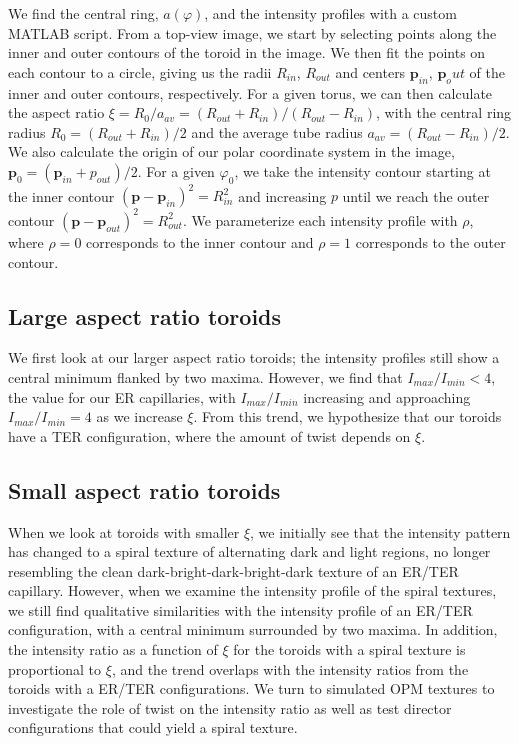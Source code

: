 We find the central ring, $a(\varphi)$, and the intensity profiles with a custom MATLAB script.
From a top-view image, we start by selecting points along the inner and outer contours of the toroid in the image.
We then fit the points on each contour to a circle, giving us the radii $R_{in}$, $R_{out}$ and centers $\mathbf{p}_{in}$, $\mathbf{p}_out$ of the inner and outer contours, respectively.
For a given torus, we can then calculate the aspect ratio $\xi = R_0/a_{av} = (R_{out}+R_{in})/(R_{out}-R_{in})$, with the central ring radius $R_0=(R_{out}+R_{in})/2$ and the average tube radius $a_{av} = (R_{out}-R_{in})/2$.
We also calculate the origin of our polar coordinate system in the image, $\mathbf{p}_0 = (\mathbf{p}_{in}+p_{out})/2$.
For a given $\varphi_0$, we take the intensity contour starting at the inner contour $(\mathbf{p}-\mathbf{p}_{in})^2 = R^2_{in}$ and increasing $p$ until we reach the outer contour $(\mathbf{p}-\mathbf{p}_{out})^2 = R^2_{out}$.
We parameterize each intensity profile with $\rho$, where $\rho = 0$ corresponds to the inner contour and $\rho = 1$ corresponds to the outer contour.


\subsection{Large aspect ratio toroids}
We first look at our larger aspect ratio toroids; the intensity profiles still show a central minimum flanked by two maxima.
However, we find that $I_{max}/I_{min} < 4$, the value for our ER capillaries, with $I_{max}/I_{min}$ increasing and approaching $I_{max}/I_{min} = 4$ as we increase $\xi$.
From this trend, we hypothesize that our toroids have a TER configuration, where the amount of twist depends on $\xi$.


\subsection{Small aspect ratio toroids}
When we look at toroids with smaller $\xi$, we initially see that the intensity pattern has changed to a spiral texture of alternating dark and light regions, no longer resembling the clean dark-bright-dark-bright-dark texture of an ER/TER capillary.
However, when we examine the intensity profile of the spiral textures, we still find qualitative similarities with the intensity profile of an ER/TER configuration, with a central minimum surrounded by two maxima.
In addition, the intensity ratio as a function of $\xi$ for the toroids with a spiral texture is proportional to $\xi$, and the trend overlaps with the intensity ratios from the toroids with a ER/TER configurations.
We turn to simulated OPM textures to investigate the role of twist on the intensity ratio as well as test director configurations that could yield a spiral texture.




